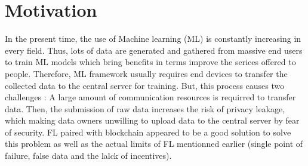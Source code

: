 \documentclass{article}
\begin{document}
\section{Motivation}
In the present time, the use of Machine learning (ML) is constantly increasing in every field. Thus, lots of data are generated and gathered from massive end users to train ML models which bring benefits in terms improve the serices offered to people. Therefore, ML framework usually requires end devices to transfer the collected data to the central server for training. But, this process causes two challenges : A large amount of communication resources is requirred to transfer data. Then, the submission of raw data increases the risk of privacy leakage, which making data owners unwilling to upload data to the central server by fear of security. FL paired with blockchain appeared to be a good solution to solve this problem as well as the actual limits of FL mentionned earlier (single point of failure, false data and the lalck of incentives).
\end{document}
